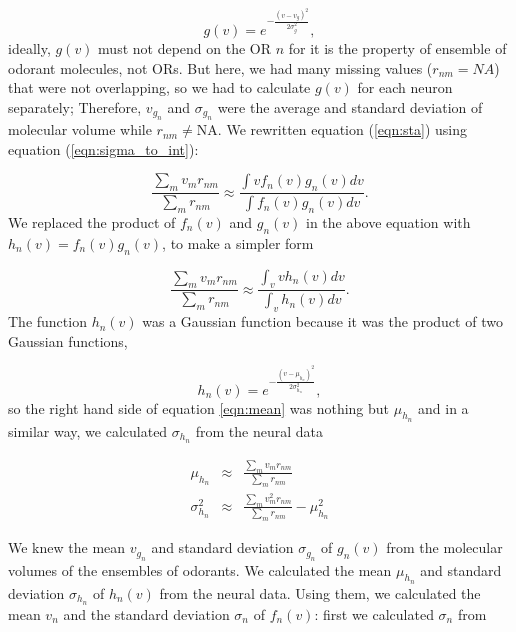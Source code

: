 \documentclass[11pt]{paper} %
\begin{document}
\begin{equation}
	g(v) = e^{-\frac{(v- v_{g})^2}{2 \sigma_{g}^2}},
	\label{eqn:hist-volumes}
\end{equation}
ideally, $g(v)$ must not depend on the OR $n$ for it is the property of ensemble of odorant molecules, not ORs. 
But here, we had many missing values ($r_{nm} = NA$) that were not overlapping, 
so we had to calculate $g(v)$ for each neuron separately; 
Therefore, $v_{g_n}$ and $\sigma_{g_n}$ were the average and standard deviation of molecular volume while $r_{nm} \neq \text{NA}$.
We rewritten equation (\ref{eqn:sta}) using equation (\ref{eqn:sigma_to_int}):

\begin{equation}
	\frac{\displaystyle \sum_{m} v_m r_{nm}}{\displaystyle \sum_{m} r_{nm}} \approx \frac{\displaystyle \int v f_n(v) g_n(v) dv}{\displaystyle \int f_n(v) g_n(v) dv}.
	\label{eqn:sta_int}
\end{equation}
We replaced the product of $f_n(v)$ and $g_n(v)$ in the above equation with $h_n(v) = f_n(v) g_n(v)$, to make a simpler form

\begin{equation}
	\frac{\displaystyle \sum_{m} v_m r_{nm}}{\displaystyle \sum_{m} r_{nm}} \approx \frac{\displaystyle \int_v v h_n(v) dv}{ \displaystyle \int_v  h_n(v) dv }.
	\label{eqn:mean}
\end{equation}
The function $h_n(v)$ was a Gaussian function because it was the product of two Gaussian functions, 

\begin{equation}
h_n(v) = e^{-\frac{(v-\mu_{h_n})^2}{2\sigma_{h_n}^2}}, 
\end{equation}
so the right hand side of equation \ref{eqn:mean} was nothing but $\mu_{h_n}$ and 
in a similar way, we calculated $\sigma_{h_n}$ from the neural data

\begin{eqnarray}
	\mu_{h_n} &\approx& \frac{\displaystyle \sum_{m} v_m r_{nm}}{\displaystyle \sum_{m} r_{nm}} \\
	\sigma_{h_n}^2 &\approx& \frac{\displaystyle \sum_{m} v_m^2 r_{nm}}{\displaystyle \sum_{m} r_{nm}} - \mu_{h_n}^2
	\label{eqn:final_h}
\end{eqnarray}


We knew the mean $v_{g_n}$ and standard deviation $\sigma_{g_n}$ of $g_n(v)$ from the molecular volumes of the ensembles of odorants. 
We calculated the mean $\mu_{h_n}$ and standard deviation $\sigma_{h_n}$ of $h_n(v)$ from the neural data.
Using them, we calculated the mean $v_n$ and the standard deviation $\sigma_n$ of $f_n(v)$:
first we calculated $\sigma_n$ from 
\end{document}
